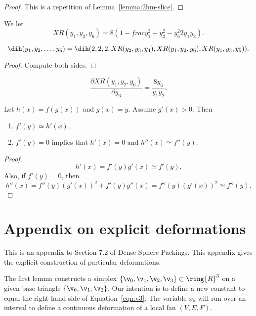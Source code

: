 \begin{proof}  This is a repetition of Lemma~\ref{lemma:2hm-slice}.
\end{proof}

\begin{definition}[$XR$]
We let
\[
XR(y_1,y_2,y_6) = 8 (1 - frac{y_1^2 + y_2^2 - y_6^2}{2 y_1 y_2}).
\]
\end{definition}

\begin{lemma}[]
\[
\dih(y_1,y_2,\ldots,y_6) = \dih(2,2,2,XR(y_2,y_3,y_4),XR(y_1,y_2,y_6),XR(y_1,y_3,y_5)).
\]
\end{lemma}

\begin{proof}
Compute both sides.
\end{proof}

\begin{lemma}[]
\[
\frac{\partial XR(y_1,y_2,y_6)}{\partial y_6} = \frac{8 y_6}{y_1 y_2}.
\]
\end{lemma}

\begin{lemma}[]
Let $h(x) = f(g(x))$ and $g(x)= y$.  Assume $g'(x)>0$.  Then
\begin{enumerate}
\item $f'(y) \simeq h'(x)$.
\item $f'(y) = 0$ implies that $h'(x) = 0$ and $h''(x)\simeq f''(y)$.
\end{enumerate}
\end{lemma}

\begin{proof}
\[
h'(x) = f'(y) g'(x) \simeq f'(y).
\]
Also, if $f'(y) = 0$, then
\[
h''(x) = f''(y) (g'(x))^2 + f'(y) g''(x) = f''(y) (g'(x))^2 \simeq f''(y).
\]
\end{proof}

\newpage
\section{Appendix on explicit deformations}\label{sec:sup-deformation}

This is an appendix to Section 7.2 of Dense Sphere Packings.
This appendix gives the explicit construction of particular deformations.

The first lemma constructs a simplex $\{\v_0,\v_1,\v_2,\v_3\}\subset\ring{R}^3$ on
a given base triangle $\{\v_0,\v_1,\v_2\}$.  Our intention is to define a new constant
to equal the right-hand side of Equation~\ref{eqn:v3}.  The variable $x_5$ will run over
an interval to define a continuous deformation of a local fan $(V,E,F)$.


